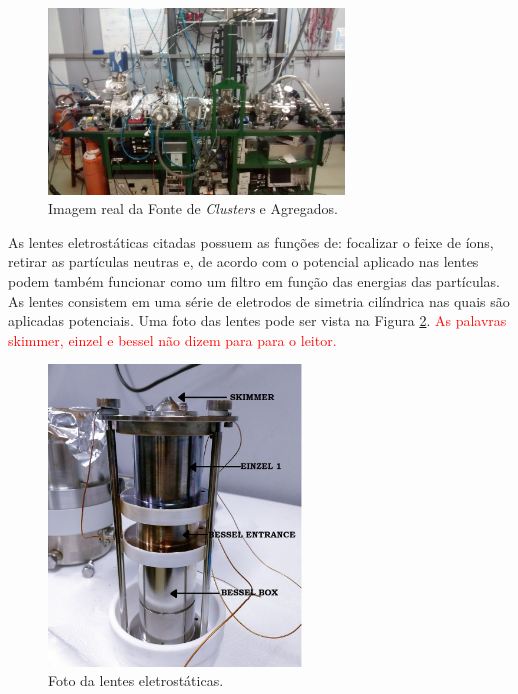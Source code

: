 \begin{figure}
  \centering
  \includegraphics[width=0.7\textwidth]{images/foca/foto_foca}
  \caption{ Imagem real da  Fonte de \textit{Clusters} e Agregados.  }
  \label{fig:foto_foca}
\end{figure}



As lentes eletrostáticas citadas possuem as funções de: focalizar o feixe de íons, retirar as partículas neutras e, de acordo com o potencial aplicado nas lentes podem também funcionar como um filtro em função das energias das partículas. As lentes consistem em uma série de eletrodos de simetria cilíndrica nas quais são aplicadas potenciais. Uma foto das lentes pode ser vista na Figura \ref{fig:foto_lentes}. \textcolor{red}{As palavras skimmer, einzel e bessel não dizem para para o leitor.}

\begin{figure}
  \centering
  \includegraphics[width=0.6\textwidth]{images/foca/lentes}
  \caption{ Foto da lentes eletrostáticas.  }
  \label{fig:foto_lentes}
\end{figure}


